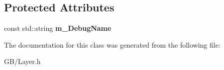 \subsection*{Protected Attributes}
\begin{DoxyCompactItemize}
\item 
\mbox{\label{class_g_b_1_1_layer_a45355d00375c65ded3e11b63fc40a7e0}} 
const std\+::string {\bfseries m\+\_\+\+Debug\+Name}
\end{DoxyCompactItemize}


The documentation for this class was generated from the following file\+:\begin{DoxyCompactItemize}
\item 
G\+B/Layer.\+h\end{DoxyCompactItemize}
